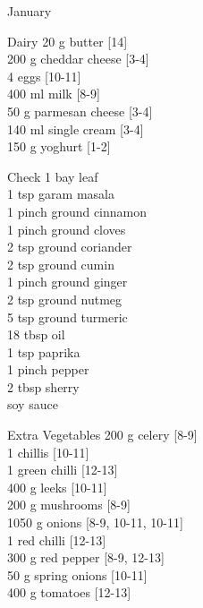 \begin{menu}{January}
      \begin{shoppinglist}{Dairy}
      20 g butter {\scriptsize[14]}\\
      200 g cheddar cheese {\scriptsize[3-4]}\\
      4  eggs {\scriptsize[10-11]}\\
      400 ml milk {\scriptsize[8-9]}\\
      50 g parmesan cheese {\scriptsize[3-4]}\\
      140 ml single cream {\scriptsize[3-4]}\\
      150 g yoghurt {\scriptsize[1-2]}\\
      \end{shoppinglist}%
      \par\vfil %
      \vfil\clearpage %
      \begin{shoppinglist}{Check}
      1  bay leaf \\
      1 tsp garam masala \\
      1 pinch ground cinnamon \\
      1 pinch ground cloves \\
      2 tsp ground coriander \\
      2 tsp ground cumin \\
      1 pinch ground ginger \\
      2 tsp ground nutmeg \\
      5 tsp ground turmeric \\
      18 tbsp oil \\
      1 tsp paprika \\
      1 pinch pepper \\
      2 tbsp sherry \\
       soy sauce \\
      \end{shoppinglist}%
      \begin{shoppinglist}{Extra Vegetables}
      200 g celery {\scriptsize[8-9]}\\
      1  chillis {\scriptsize[10-11]}\\
      1  green chilli {\scriptsize[12-13]}\\
      400 g leeks {\scriptsize[10-11]}\\
      200 g mushrooms {\scriptsize[8-9]}\\
      1050 g onions {\scriptsize[8-9, 10-11, 10-11]}\\
      1  red chilli {\scriptsize[12-13]}\\
      300 g red pepper {\scriptsize[8-9, 12-13]}\\
      50 g spring onions {\scriptsize[10-11]}\\
      400 g tomatoes {\scriptsize[12-13]}\\
      \end{shoppinglist}%
      \par\vfil %
    \vfil\clearpage
  

\end{menu}
